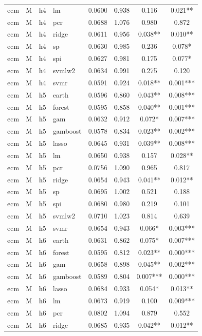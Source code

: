 \begin{ThreePartTable}
\begin{longtable}[t]{llclcccc}
ecm & M & h4 & lm & 0.0600 & 0.938 & 0.116 & 0.021**\\
ecm & M & h4 & pcr & 0.0688 & 1.076 & 0.980 & 0.872\\
ecm & M & h4 & ridge & 0.0611 & 0.956 & 0.038** & 0.010**\\
ecm & M & h4 & sp & 0.0630 & 0.985 & 0.236 & 0.078*\\
ecm & M & h4 & spi & 0.0627 & 0.981 & 0.175 & 0.077*\\
ecm & M & h4 & svmlw2 & 0.0634 & 0.991 & 0.275 & 0.120\\
ecm & M & h4 & svmr & 0.0591 & 0.924 & 0.018** & 0.001***\\
\addlinespace
ecm & M & h5 & earth & 0.0596 & 0.860 & 0.043** & 0.008***\\
ecm & M & h5 & forest & 0.0595 & 0.858 & 0.040** & 0.001***\\
ecm & M & h5 & gam & 0.0632 & 0.912 & 0.072* & 0.007***\\
ecm & M & h5 & gamboost & 0.0578 & 0.834 & 0.023** & 0.002***\\
ecm & M & h5 & lasso & 0.0645 & 0.931 & 0.039** & 0.008***\\
ecm & M & h5 & lm & 0.0650 & 0.938 & 0.157 & 0.028**\\
ecm & M & h5 & pcr & 0.0756 & 1.090 & 0.965 & 0.817\\
ecm & M & h5 & ridge & 0.0654 & 0.943 & 0.041** & 0.012**\\
ecm & M & h5 & sp & 0.0695 & 1.002 & 0.521 & 0.188\\
ecm & M & h5 & spi & 0.0680 & 0.980 & 0.219 & 0.101\\
ecm & M & h5 & svmlw2 & 0.0710 & 1.023 & 0.814 & 0.639\\
ecm & M & h5 & svmr & 0.0654 & 0.943 & 0.066* & 0.003***\\
\addlinespace
ecm & M & h6 & earth & 0.0631 & 0.862 & 0.075* & 0.007***\\
ecm & M & h6 & forest & 0.0595 & 0.812 & 0.023** & 0.000***\\
ecm & M & h6 & gam & 0.0658 & 0.898 & 0.045** & 0.002***\\
ecm & M & h6 & gamboost & 0.0589 & 0.804 & 0.007*** & 0.000***\\
ecm & M & h6 & lasso & 0.0684 & 0.933 & 0.054* & 0.013**\\
ecm & M & h6 & lm & 0.0673 & 0.919 & 0.100 & 0.009***\\
ecm & M & h6 & pcr & 0.0802 & 1.094 & 0.879 & 0.552\\
ecm & M & h6 & ridge & 0.0685 & 0.935 & 0.042** & 0.012**\\

\end{longtable}
\end{ThreePartTable}
